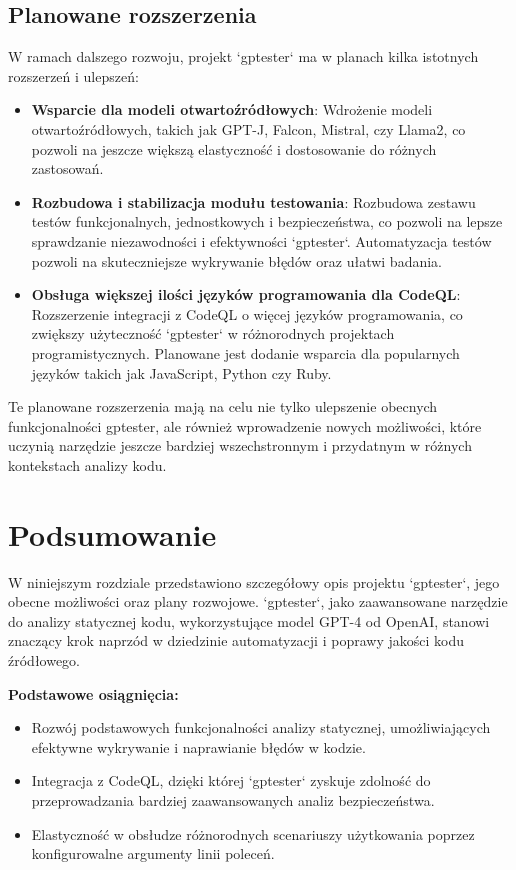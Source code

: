 \subsection{Planowane rozszerzenia}
\label{subsec:planowane_rozszerzenia}

W ramach dalszego rozwoju, projekt `gptester` ma w planach kilka istotnych rozszerzeń i ulepszeń:

\begin{itemize}
    \item \textbf{Wsparcie dla modeli otwartoźródłowych}: Wdrożenie modeli otwartoźródłowych, takich jak GPT-J, Falcon, Mistral, czy Llama2, co pozwoli na jeszcze większą elastyczność i dostosowanie do różnych zastosowań.
    \item \textbf{Rozbudowa i stabilizacja modułu testowania}: Rozbudowa zestawu testów funkcjonalnych, jednostkowych i bezpieczeństwa, co pozwoli na lepsze sprawdzanie niezawodności i efektywności `gptester`. Automatyzacja testów pozwoli na skuteczniejsze wykrywanie błędów oraz ułatwi badania.
    \item \textbf{Obsługa większej ilości języków programowania dla CodeQL}: Rozszerzenie integracji z CodeQL o więcej języków programowania, co zwiększy użyteczność `gptester` w różnorodnych projektach programistycznych. Planowane jest dodanie wsparcia dla popularnych języków takich jak JavaScript, Python czy Ruby.
\end{itemize}

Te planowane rozszerzenia mają na celu nie tylko ulepszenie obecnych funkcjonalności gptester, ale również wprowadzenie nowych możliwości, które uczynią narzędzie jeszcze bardziej wszechstronnym i przydatnym w różnych kontekstach analizy kodu.
\section{Podsumowanie}
\label{sec:podsumowanie}

W niniejszym rozdziale przedstawiono szczegółowy opis projektu `gptester`, jego obecne możliwości oraz plany rozwojowe. `gptester`, jako zaawansowane narzędzie do analizy statycznej kodu, wykorzystujące model GPT-4 od OpenAI, stanowi znaczący krok naprzód w dziedzinie automatyzacji i poprawy jakości kodu źródłowego.

\textbf{Podstawowe osiągnięcia:}
\begin{itemize}
    \item Rozwój podstawowych funkcjonalności analizy statycznej, umożliwiających efektywne wykrywanie i naprawianie błędów w kodzie.
    \item Integracja z CodeQL, dzięki której `gptester` zyskuje zdolność do przeprowadzania bardziej zaawansowanych analiz bezpieczeństwa.
    \item Elastyczność w obsłudze różnorodnych scenariuszy użytkowania poprzez konfigurowalne argumenty linii poleceń.
\end{itemize}

